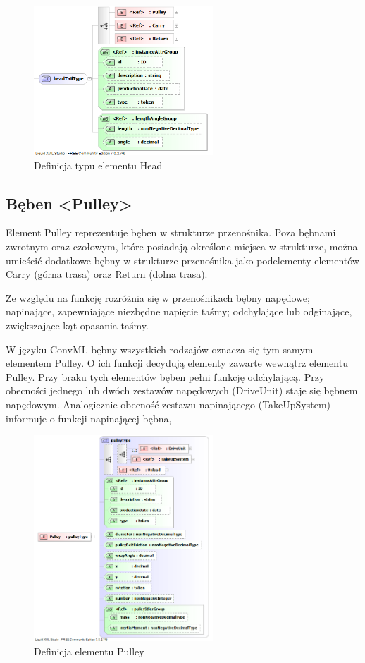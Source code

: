 \documentclass[12pt,a4paper]{article}
\begin{document}
\begin{figure}[h]
  \centering
  \includegraphics[width=0.6\textwidth]{png/liquid/headTailType}
  \caption{Definicja typu elementu Head}
  \label{fig:headTailType-xsd}
\end{figure}


\subsection{Bęben <Pulley>}
Element Pulley reprezentuje bęben w strukturze przenośnika.  Poza bębnami
zwrotnym oraz czołowym, które posiadają określone miejsca w strukturze, można
umieścić dodatkowe bębny w strukturze przenośnika jako podelementy elementów
Carry (górna trasa) oraz Return (dolna trasa).

Ze względu na funkcję rozróżnia się w przenośnikach bębny napędowe; napinające,
zapewniające niezbędne napięcie taśmy; odchylające lub odginające, zwiększające
kąt opasania taśmy.

W języku ConvML bębny wszystkich rodzajów oznacza się tym samym elementem
Pulley.  O ich funkcji decydują elementy zawarte wewnątrz elementu Pulley. Przy
braku tych elementów bęben pełni funkcję odchylającą.  Przy obecności jednego
lub dwóch zestawów napędowych (DriveUnit) staje się bębnem napędowym.
Analogicznie obecność zestawu napinającego (TakeUpSystem) informuje o funkcji
napinającej bębna,

\begin{figure}[h]
  \centering
  \includegraphics[width=0.6\textwidth]{png/liquid/Pulley}
  \caption{Definicja elementu Pulley}
  \label{fig:pulley-xsd}
\end{figure}
\end{document}
